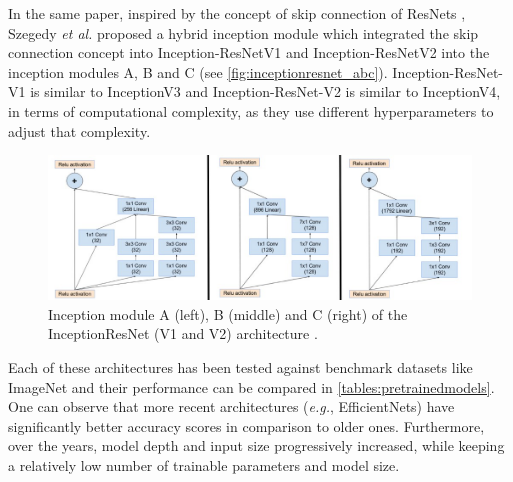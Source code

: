     In the same paper, inspired by the concept of skip connection of ResNets \cite{resnet}, Szegedy \textit{et al.} proposed a hybrid inception module which integrated the skip connection concept into Inception-ResNetV1 and Inception-ResNetV2 into the inception modules A, B and C (see \autoref{fig:inceptionresnet_abc}). Inception-ResNet-V1 is similar to InceptionV3 and Inception-ResNet-V2 is similar to InceptionV4, in terms of computational complexity, as they use different hyperparameters to adjust that complexity. \par

    \begin{figure}[ht]
      \centering
        \includegraphics[width=\linewidth]{figs/inceptionresnet_abc.jpeg}
      \caption{Inception module A (left), B (middle) and C (right) of the InceptionResNet (V1 and V2) architecture \cite{inceptionv4}.}
      \label{fig:inceptionresnet_abc}
    \end{figure}
    
    
    Each of these architectures has been tested against benchmark datasets like ImageNet and their performance can be compared in \autoref{tables:pretrainedmodels}. One can observe that more recent architectures (\textit{e.g.}, EfficientNets) have significantly better accuracy scores in comparison to older ones. Furthermore, over the years, model depth and input size progressively increased, while keeping a relatively low number of trainable parameters and model size. \par 
    
